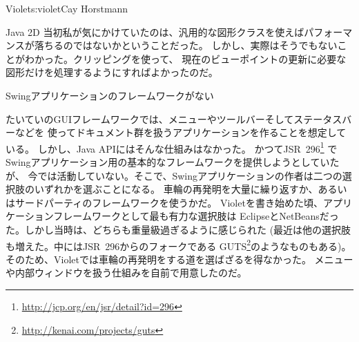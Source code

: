 \begin{aosachapter}{Violet}{s:violet}{Cay Horstmann}
\begin{aosasect1}{Java 2D}
当初私が気にかけていたのは、汎用的な図形クラスを使えばパフォーマンスが落ちるのではないかということだった。
しかし、実際はそうでもないことがわかった。クリッピングを使って、
現在のビューポイントの更新に必要な図形だけを処理するようにすればよかったのだ。

\end{aosasect1}

\begin{aosasect1}{Swingアプリケーションのフレームワークがない}

たいていのGUIフレームワークでは、メニューやツールバーそしてステータスバーなどを
使ってドキュメント群を扱うアプリケーションを作ることを想定している。
しかし、Java APIにはそんな仕組みはなかった。
かつてJSR~296\footnote{\url{http://jcp.org/en/jsr/detail?id=296}}
でSwingアプリケーション用の基本的なフレームワークを提供しようとしていたが、
今では活動していない。そこで、Swingアプリケーションの作者は二つの選択肢のいずれかを選ぶことになる。
車輪の再発明を大量に繰り返すか、あるいはサードパーティのフレームワークを使うかだ。
Violetを書き始めた頃、アプリケーションフレームワークとして最も有力な選択肢は
EclipseとNetBeansだった。しかし当時は、どちらも重量級過ぎるように感じられた
(最近は他の選択肢も増えた。中にはJSR~296からのフォークである
GUTS\footnote{\url{http://kenai.com/projects/guts}}のようなものもある)。
そのため、Violetでは車輪の再発明をする道を選ばざるを得なかった。
メニューや内部ウィンドウを扱う仕組みを自前で用意したのだ。


\end{aosasect1}
\end{aosachapter}
